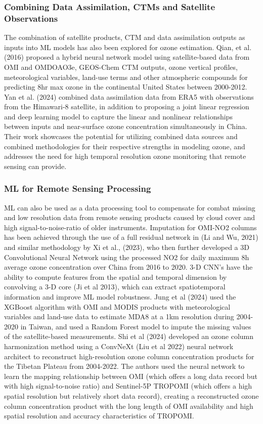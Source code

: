 \documentclass[gmd, manuscript]{copernicus}
\begin{document}
\subsubsection{Combining Data Assimilation, CTMs and Satellite Observations}
The combination of satellite products, CTM and data assimilation outputs as inputs into ML models has also been explored for ozone estimation. Qian, et al. (2016) proposed a hybrid neural network model using satellite-based data from OMI and OMDOAO3e, GEOS-Chem CTM outputs, ozone vertical profiles, meteorological variables, land-use terms and other atmospheric compounds for predicting 8hr max ozone in the continental United States between 2000-2012. Yan et al. (2024) combined data assimilation data from ERA5 with observations from the Himawari-8 satellite, in addition to proposing a joint linear regression and deep learning model to capture the linear and nonlinear relationships between inputs and near-surface ozone concentration simultaneously in China. Their work showcases the potential for utilizing combined data sources and combined methodologies for their respective strengths in modeling ozone, and addresses the need for high temporal resolution ozone monitoring that remote sensing can provide.
\subsubsection{ML for Remote Sensing Processing}
ML can also be used as a data processing tool to compensate for combat missing and low resolution data from remote sensing products caused by cloud cover and high signal-to-noise-ratio of older instruments. Imputation for OMI-NO2 columns has been achieved through the use of a full residual network in (Li and Wu, 2021) and similar methodology by Xi et al., (2023), who then further developed a 3D Convolutional Neural Network using the processed NO2 for daily maximum 8h average ozone concentration over China from 2016 to 2020. 3-D CNN’s have the ability to compute features from the spatial and temporal dimension by convolving a 3-D core (Ji et al 2013), which can extract spatiotemporal information and improve ML model robustness. Jung et al (2024) used the XGBoost algorithm with OMI and MODIS products with meteorological variables and land-use data to estimate MDA8 at a 1km resolution during 2004-2020 in Taiwan, and used a Random Forest model to impute the missing values of the satellite-based measurements. Shi et al (2024) developed an ozone column harmonization method using a ConvNeXt (Liu et al 2022) neural network architect to reconstruct high-resolution ozone column concentration products for the Tibetan Plateau from 2004-2022. The authors used the neural network to learn the mapping relationship between OMI (which offers a long data record but with high signal-to-noise ratio) and Sentinel-5P TROPOMI (which offers a high spatial resolution but relatively short data record), creating a reconstructed ozone column concentration product with the long length of OMI availability and high spatial resolution and accuracy characteristics of TROPOMI. 
\end{document}
